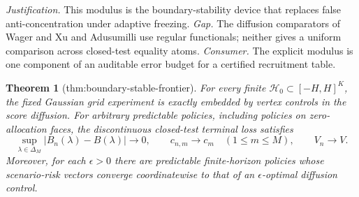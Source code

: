 \documentclass{article}
\newtheorem{theorem}{Theorem}
\begin{document}
\par\smallskip\noindent \textit{Justification.} This modulus is the boundary-stability device that replaces false anti-concentration under adaptive freezing. \textit{Gap.} The diffusion comparators of Wager and Xu and Adusumilli use regular functionals; neither gives a uniform comparison across closed-test equality atoms. \textit{Consumer.} The explicit modulus is one component of an auditable error budget for a certified recruitment table.

\begin{theorem}[thm:boundary-stable-frontier]\label{thm:boundary-stable-frontier}
For every finite \(\mathcal H_0\subset[-H,H]^K\), the fixed Gaussian grid experiment is exactly embedded by vertex controls in the score diffusion. For arbitrary predictable policies, including policies on zero-allocation faces, the discontinuous closed-test terminal loss satisfies
\[
\sup_{\lambda\in\Delta_M}|B_n(\lambda)-B(\lambda)|\longrightarrow0,
\qquad c_{n,m}\longrightarrow c_m\quad(1\leq m\leq M),
\qquad V_n\longrightarrow V.
\]
Moreover, for each \(\epsilon>0\) there are predictable finite-horizon policies whose scenario-risk vectors converge coordinatewise to that of an \(\epsilon\)-optimal diffusion control.
\end{theorem}
\end{document}

